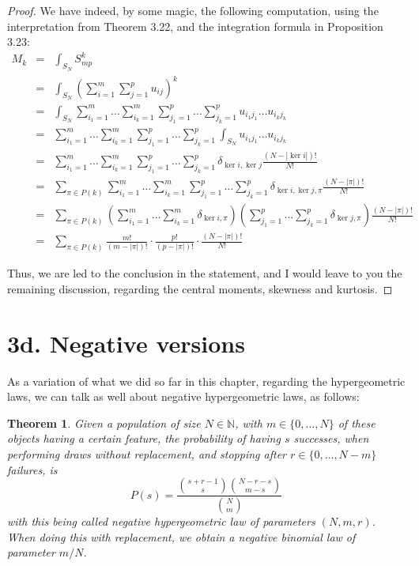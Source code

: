 \documentclass[12pt]{amsbook}
\newtheorem{theorem}{Theorem}[chapter]
\begin{document}
\begin{proof}
We have indeed, by some magic, the following computation, using the interpretation from Theorem 3.22, and the integration formula in Proposition 3.23:
\begin{eqnarray*}
M_k
&=&\int_{S_N}S_{mp}^k\\
&=&\int_{S_N}\left(\sum_{i=1}^m\sum_{j=1}^pu_{ij}\right)^k\\
&=&\int_{S_N}\sum_{i_1=1}^m\ldots\sum_{i_k=1}^m\sum_{j_1=1}^p\ldots\sum_{j_k=1}^pu_{i_1j_1}\ldots u_{i_kj_k}\\
&=&\sum_{i_1=1}^m\ldots\sum_{i_k=1}^m\sum_{j_1=1}^p\ldots\sum_{j_k=1}^p\int_{S_N}u_{i_1j_1}\ldots u_{i_kj_k}\\
&=&\sum_{i_1=1}^m\ldots\sum_{i_k=1}^m\sum_{j_1=1}^p\ldots\sum_{j_k=1}^p\delta_{\ker i,\ker j}\frac{(N-|\ker i|)!}{N!}\\
&=&\sum_{\pi\in P(k)}\sum_{i_1=1}^m\ldots\sum_{i_k=1}^m\sum_{j_1=1}^p\ldots\sum_{j_k=1}^p\delta_{\ker i,\ker j,\pi}\frac{(N-|\pi|)!}{N!}\\
&=&\sum_{\pi\in P(k)}\left(\sum_{i_1=1}^m\ldots\sum_{i_k=1}^m\delta_{\ker i,\pi}\right)
\left(\sum_{j_1=1}^p\ldots\sum_{j_k=1}^p\delta_{\ker j,\pi}\right)\frac{(N-|\pi|)!}{N!}\\
&=&\sum_{\pi\in P(k)}\frac{m!}{(m-|\pi|)!}\cdot\frac{p!}{(p-|\pi|)!}\cdot\frac{(N-|\pi|)!}{N!}
\end{eqnarray*}

Thus, we are led to the conclusion in the statement, and I would leave to you the remaining discussion, regarding the central moments, skewness and kurtosis.
\end{proof}

\section*{3d. Negative versions}

As a variation of what we did so far in this chapter, regarding the hypergeometric laws, we can talk as well about negative hypergeometric laws, as follows:


\begin{theorem}
Given a population of size $N\in\mathbb N$, with $m\in\{0,\ldots,N\}$ of these objects having a certain feature, the probability of having $s$ successes, when performing draws without replacement, and stopping after $r\in\{0,\ldots,N-m\}$ failures, is
$$P(s)=\frac{\binom{s+r-1}{s}\binom{N-r-s}{m-s}}{\binom{N}{m}}$$
with this being called negative hypergeometric law of parameters $(N,m,r)$. When doing this with replacement, we obtain a negative binomial law of parameter $m/N$.
\end{theorem}
\end{document}
